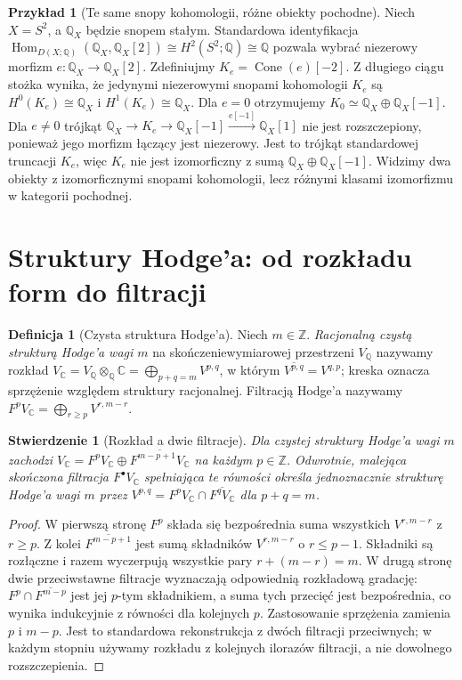 \documentclass[11pt,a4paper,oneside]{report}
\newcommand{\C}{\mathbb{C}}
\newcommand{\Z}{\mathbb{Z}}
\newcommand{\Q}{\mathbb{Q}}
\theoremstyle{plain}
\newtheorem{stwierdzenie}[twierdzenie]{Stwierdzenie}
\theoremstyle{definition}
\newtheorem{definicja}[twierdzenie]{Definicja}
\newtheorem{przyklad}[twierdzenie]{Przykład}
\theoremstyle{remark}
\begin{document}
\begin{przyklad}[Te same snopy kohomologii, różne obiekty pochodne]
\label{ex:derived-not-split-xiv}
Niech $X=S^2$, a $\Q_X$ będzie snopem stałym.
Standardowa identyfikacja
$\operatorname{Hom}_{D(X;\Q)}(\Q_X,\Q_X[2])
\cong H^2(S^2;\Q)\cong\Q$
pozwala wybrać niezerowy morfizm
$e:\Q_X\to\Q_X[2]$.
Zdefiniujmy $K_e=\operatorname{Cone}(e)[-2]$.
Z długiego ciągu stożka wynika, że jedynymi
niezerowymi snopami kohomologii $K_e$ są
$H^0(K_e)\cong\Q_X$ i $H^1(K_e)\cong\Q_X$.
Dla $e=0$ otrzymujemy
$K_0\simeq\Q_X\oplus\Q_X[-1]$.
Dla $e\ne0$ trójkąt
$\Q_X\to K_e\to\Q_X[-1]\xrightarrow{e[-1]}\Q_X[1]$
nie jest rozszczepiony, ponieważ jego morfizm łączący
jest niezerowy. Jest to trójkąt standardowej truncacji
$K_e$, więc $K_e$ nie jest izomorficzny z sumą
$\Q_X\oplus\Q_X[-1]$.
Widzimy dwa obiekty z izomorficznymi snopami
kohomologii, lecz różnymi klasami izomorfizmu
w kategorii pochodnej.
\end{przyklad}

\section{Struktury Hodge'a: od rozkładu form do filtracji}
\begin{definicja}[Czysta struktura Hodge'a]
Niech $m\in\Z$. \emph{Racjonalną czystą strukturą
Hodge'a wagi $m$} na skończeniewymiarowej przestrzeni
$V_{\Q}$ nazywamy rozkład
$V_{\C}=V_{\Q}\otimes_{\Q}\C=\bigoplus_{p+q=m}V^{p,q}$,
w którym $\overline{V^{p,q}}=V^{q,p}$; kreska oznacza
sprzężenie względem struktury racjonalnej.
Filtracją Hodge'a nazywamy
$F^pV_{\C}=\bigoplus_{r\ge p}V^{r,m-r}$.
\end{definicja}
\begin{stwierdzenie}[Rozkład a dwie filtracje]
\label{prop:hodge-filtration-xiv}
Dla czystej struktury Hodge'a wagi $m$ zachodzi
$V_{\C}=F^pV_{\C}\oplus\overline{F^{m-p+1}V_{\C}}$
na każdym $p\in\Z$. Odwrotnie, malejąca skończona
filtracja $F^\bullet V_{\C}$ spełniająca te równości
określa jednoznacznie strukturę Hodge'a wagi $m$ przez
$V^{p,q}=F^pV_{\C}\cap\overline{F^qV_{\C}}$
dla $p+q=m$.
\end{stwierdzenie}
\begin{proof}
W pierwszą stronę $F^p$ składa się bezpośrednia suma
wszystkich $V^{r,m-r}$ z $r\ge p$. Z kolei
$\overline{F^{m-p+1}}$ jest sumą składników
$V^{r,m-r}$ o $r\le p-1$. Składniki są rozłączne
i razem wyczerpują wszystkie pary $r+(m-r)=m$.
W drugą stronę dwie przeciwstawne filtracje
wyznaczają odpowiednią rozkładową gradację:
$F^p\cap\overline{F^{m-p}}$ jest jej $p$-tym składnikiem,
a suma tych przecięć jest bezpośrednia, co wynika
indukcyjnie z równości dla kolejnych $p$.
Zastosowanie sprzężenia zamienia $p$ i $m-p$.
Jest to standardowa rekonstrukcja z dwóch filtracji przeciwnych;
w każdym stopniu używamy rozkładu z kolejnych
ilorazów filtracji, a nie dowolnego rozszczepienia.
\end{proof}
\end{document}
